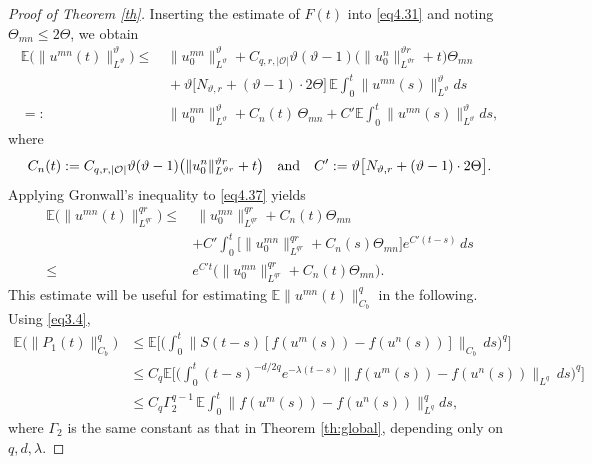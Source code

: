 \documentclass[10pt]{article}
\numberwithin{figure}{section}
\numberwithin{equation}{section}
\newcommand{\0}{{\theta}}
\begin{document}
\begin{proof}[Proof of Theorem \ref{th}]
Inserting the estimate of $F(t)$ into \eqref{eq4.31} and noting $\Theta_{mn}\le 2\Theta$, we obtain 
\begin{equation}\label{eq4.37}
\begin{split}
\mathbb{E}\big(\|u^{mn}(t)\|_{L^\vartheta}^\vartheta\big)\le&\,\|u^{mn}_0\|_{L^\vartheta}^\vartheta +C_{q,r,|\mathcal{O}|}\vartheta(\vartheta-1)\big(\|u_0^n\|_{L^{\vartheta r}}^{\vartheta r} + t \big)\Theta_{mn}
\\
&\,+ \vartheta \big[ N_{\vartheta,r}+(\vartheta-1)\cdot 2\Theta \big] \,\mathbb{E}\int_0^t \|u^{mn}(s)\|_{L^\vartheta}^{\vartheta}ds\\
=:& \,\|u^{mn}_0\|_{L^\vartheta}^\vartheta+C_n(t)\,\Theta_{mn}+C'\mathbb{E}\int_0^t \|u^{mn}(s)\|_{L^\vartheta}^{\vartheta}ds,
\end{split}
\end{equation}
where 
$$
C_n(t):=C_{q,r,|\mathcal{O}|}\vartheta(\vartheta-1)\big(\|u_0^n\|_{L^{\vartheta r}}^{\vartheta r} + t \big)\quad\hbox{and} \quad
C':=\vartheta\big[ N_{\vartheta,r}+(\vartheta-1)\cdot 2\Theta \big].
$$
Applying Gronwall's inequality to \eqref{eq4.37} yields
\begin{equation}\label{eq4.34}
\begin{aligned}
\mathbb{E}\big(\|u^{mn}(t)\|_{L^{qr}}^{qr}\big)
\le&\ \|u^{mn}_0\|_{L^{qr}}^{qr} + C_n(t)\Theta_{mn} \\
&+ C' \int_0^t \big[\|u^{mn}_0\|_{L^{qr}}^{qr} + C_n(s)\Theta_{mn} \big] e^{C'(t-s)} \, ds \\
\le&e^{C't}\big(\|u^{mn}_0\|_{L^{qr}}^{qr} + C_n(t)\Theta_{mn} \big).
\end{aligned}
\end{equation}
This estimate will be useful for estimating $\mathbb{E}\|u^{mn}(t)\|_{C_b}^q$ in the following.
\vs
Using \eqref{eq3.4},
\begin{equation}\label{eq4.35}
\begin{aligned}
\mathbb{E}\big(\|P_1(t)\|_{C_b}^q\big)
&\le \mathbb{E}\Big[\Big( \int_0^t \|S(t-s) [ f(u^m(s)) - f(u^n(s)) ]\|_{C_b} \, ds \Big)^q\Big] \\
&\le C_q\mathbb{E}\Big[\Big( \int_0^t (t-s)^{-d/{2q}}e^{-\lambda(t-s)}\|f(u^m(s)) - f(u^n(s)) \|_{L^q} \, ds \Big)^q\Big] \\
&\le C_q \Gamma_2^{q-1}\, \mathbb{E}\int_0^t \| f(u^m(s)) - f(u^n(s)) \|_{L^q}^q ds,
\end{aligned}
\end{equation}
where $\Gamma_2$ is the same constant as that in Theorem \ref{th:global}, depending only on $q,d,\lambda$.

\end{proof}
\end{document}
